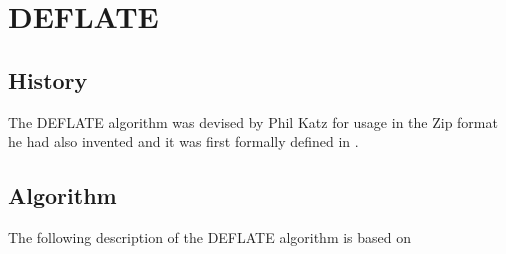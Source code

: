 \begin{comment}
  
\end{comment}

\chapter{DEFLATE}
\label{cha:deflate}

\section{History}

The DEFLATE algorithm was devised by Phil Katz for usage in the Zip
format he had also invented and it was first formally defined in
\cite{deutsch96:_deflat_compr_data_format_specif}.

\section{Algorithm}

The following description of the DEFLATE algorithm is based on \cite{pkware:_appnot,deutsch96:_deflat_compr_data_format_specif,Salomon:2004:DCC,feldspar:_explan_deflat_algor}
